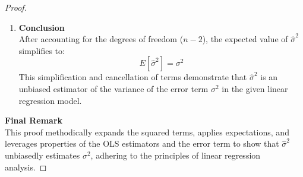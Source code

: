\documentclass[12pt]{amsart}
\theoremstyle{definition}
\numberwithin{equation}{section}
\theoremstyle{plain}
\begin{document}
\begin{proof}
\begin{enumerate}[label=Step \arabic*:]
        \item \textbf{Conclusion}\\
        After accounting for the degrees of freedom (\(n-2\)), the expected value of \(\hat{\sigma}^2\) simplifies to:  
        \[ E[\hat{\sigma}^2] = \sigma^2 \]  
        This simplification and cancellation of terms demonstrate that \(\hat{\sigma}^2\) is an unbiased estimator of the variance of the error term \(\sigma^2\) in the given linear regression model.
    \end{enumerate}
    
    \textbf{Final Remark}\\
    This proof methodically expands the squared terms, applies expectations, and leverages properties of the OLS estimators and the error term to show that \(\hat{\sigma}^2\) unbiasedly estimates \(\sigma^2\), adhering to the principles of linear regression analysis.
\end{proof}
\end{document}
